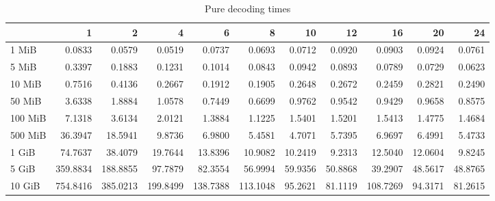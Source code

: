 \begin{table}[!h]
	\caption{Pure decoding times}
\begin{tabular}{lrrrrrrrrrr}
	\toprule
	\diagbox{File sizes }{Threads} &        1  &        2  &        4  &        6  &        8  &       10 &       12 &        16 &       20 &       24 \\
	\midrule
	1 MiB   &    0.0833 &    0.0579 &    0.0519 &    0.0737 &    0.0693 &   0.0712 &   0.0920 &    0.0903 &   0.0924 &   0.0761 \\
	5 MiB   &    0.3397 &    0.1883 &    0.1231 &    0.1014 &    0.0843 &   0.0942 &   0.0893 &    0.0789 &   0.0729 &   0.0623 \\
	10 MiB  &    0.7516 &    0.4136 &    0.2667 &    0.1912 &    0.1905 &   0.2648 &   0.2672 &    0.2459 &   0.2821 &   0.2490 \\
	50 MiB  &    3.6338 &    1.8884 &    1.0578 &    0.7449 &    0.6699 &   0.9762 &   0.9542 &    0.9429 &   0.9658 &   0.8575 \\
	100 MiB &    7.1318 &    3.6134 &    2.0121 &    1.3884 &    1.1225 &   1.5401 &   1.5201 &    1.5413 &   1.4775 &   1.4684 \\
	500 MiB &   36.3947 &   18.5941 &    9.8736 &    6.9800 &    5.4581 &   4.7071 &   5.7395 &    6.9697 &   6.4991 &   5.4733 \\
	1 GiB   &   74.7637 &   38.4079 &   19.7644 &   13.8396 &   10.9082 &  10.2419 &   9.2313 &   12.5040 &  12.0604 &   9.8245 \\
	5 GiB   &  359.8834 &  188.8855 &   97.7879 &   82.3554 &   56.9994 &  59.9356 &  50.8868 &   39.2907 &  48.5617 &  48.8765 \\
	10 GiB  &  754.8416 &  385.0213 &  199.8499 &  138.7388 &  113.1048 &  95.2621 &  81.1119 &  108.7269 &  94.3171 &  81.2615 \\
	\bottomrule
\end{tabular}
\end{table}

